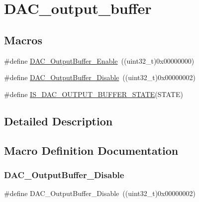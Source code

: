 \hypertarget{group___d_a_c__output__buffer}{}\section{D\+A\+C\+\_\+output\+\_\+buffer}
\label{group___d_a_c__output__buffer}
\subsection*{Macros}
\begin{DoxyCompactItemize}
\item 
\#define \mbox{\hyperlink{group___d_a_c__output__buffer_gab3f92803a8b6bc5fb3e4859908b5161f}{D\+A\+C\+\_\+\+Output\+Buffer\+\_\+\+Enable}}~((uint32\+\_\+t)0x00000000)
\item 
\#define \mbox{\hyperlink{group___d_a_c__output__buffer_gad41f919d7141398cfdedf8218ce64450}{D\+A\+C\+\_\+\+Output\+Buffer\+\_\+\+Disable}}~((uint32\+\_\+t)0x00000002)
\item 
\#define \mbox{\hyperlink{group___d_a_c__output__buffer_gaa5a56816d641129fb62d11133c9dcccd}{I\+S\+\_\+\+D\+A\+C\+\_\+\+O\+U\+T\+P\+U\+T\+\_\+\+B\+U\+F\+F\+E\+R\+\_\+\+S\+T\+A\+TE}}(S\+T\+A\+TE)
\end{DoxyCompactItemize}


\subsection{Detailed Description}


\subsection{Macro Definition Documentation}
\mbox{\label{group___d_a_c__output__buffer_gad41f919d7141398cfdedf8218ce64450}} 
\subsubsection{\texorpdfstring{DAC\_OutputBuffer\_Disable}{DAC\_OutputBuffer\_Disable}}
{\footnotesize\ttfamily \#define D\+A\+C\+\_\+\+Output\+Buffer\+\_\+\+Disable~((uint32\+\_\+t)0x00000002)}

\mbox{\label{group___d_a_c__output__buffer_gab3f92803a8b6bc5fb3e4859908b5161f}} 
